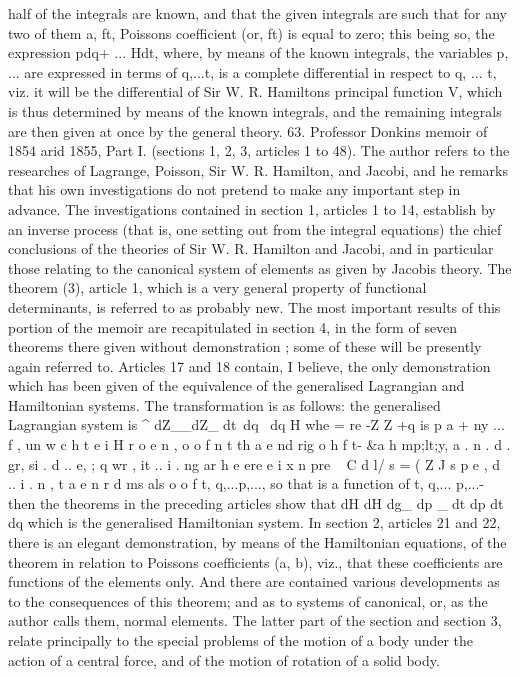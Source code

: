 \documentclass[11pt,a4paper]{book}
\begin{document}

half of the integrals are known, and that the given integrals are such that for any
two of them a, ft, Poissons coefficient (or, ft) is equal to zero; this being so, the
expression pdq+ ... Hdt, where, by means of the known integrals, the variables p, ...
are expressed in terms of q,...t, is a complete differential in respect to q, ... t, viz.
it will be the differential of Sir W. R. Hamiltons principal function V, which is
thus determined by means of the known integrals, and the remaining integrals are
then given at once by the general theory.
63. Professor Donkins memoir of 1854 arid 1855, Part I. (sections 1, 2, 3, articles
1 to 48). The author refers to the researches of Lagrange, Poisson, Sir W. R. Hamilton,
and Jacobi, and he remarks that his own investigations do not pretend to make any
important step in advance. The investigations contained in section 1, articles 1 to 14,
establish by an inverse process (that is, one setting out from the integral equations)
the chief conclusions of the theories of Sir W. R. Hamilton and Jacobi, and in
particular those relating to the canonical system of elements as given by Jacobis
theory. The theorem (3), article 1, which is a very general property of functional
determinants, is referred to as probably new. The most important results of this portion
of the memoir are recapitulated in section 4, in the form of seven theorems there
given without demonstration ; some of these will be presently again referred to. Articles
17 and 18 contain, I believe, the only demonstration which has been given of the
equivalence of the generalised Lagrangian and Hamiltonian systems. The transformation
is as follows: the generalised Lagrangian system is
^
dZ__dZ_
dt~dq ~dq
H whe = re -Z Z +q is p a + ny ... f , un w c h t e i H r o e n , o o f n t th a e nd rig o h f t- &a h mp;lt;y, a . n . d . gr, si . d .. e, ; q wr , it .. i . ng ar h e ere e i x n pre ~ C d l/ s = ( Z J s p e , d .. i . n , t a e n r d ms als o o f
t, q,...p,..., so that is a function of t, q,... p,...- then the theorems in the
preceding articles show that
dH dH
dg_ dp _
dt dp dt~ dq
which is the generalised Hamiltonian system.
In section 2, articles 21 and 22, there is an elegant demonstration, by means of
the Hamiltonian equations, of the theorem in relation to Poissons coefficients (a, b),
viz., that these coefficients are functions of the elements only. And there are contained
various developments as to the consequences of this theorem; and as to systems of
canonical, or, as the author calls them, normal elements. The latter part of the
section and section 3, relate principally to the special problems of the motion of a
body under the action of a central force, and of the motion of rotation of a solid body.
\end{document}
